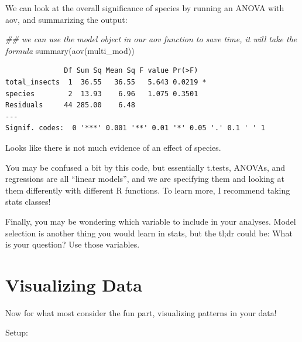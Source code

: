 \documentclass[
  letterpaper,
  DIV=11,
  numbers=noendperiod]{scrreprt}
\newenvironment{Shaded}{\begin{snugshade}}{\end{snugshade}}
\newcommand{\DocumentationTok}[1]{\textcolor[rgb]{0.37,0.37,0.37}{\textit{#1}}}
\newcommand{\FunctionTok}[1]{\textcolor[rgb]{0.28,0.35,0.67}{#1}}
\newcommand{\NormalTok}[1]{\textcolor[rgb]{0.00,0.23,0.31}{#1}}
\begin{document}
We can look at the overall significance of species by running an ANOVA
with aov, and summarizing the output:

\begin{Shaded}
\begin{Highlighting}[]
\DocumentationTok{\#\# we can use the model object in our aov function to save time, it will take the formula}
\FunctionTok{summary}\NormalTok{(}\FunctionTok{aov}\NormalTok{(multi\_mod))}
\end{Highlighting}
\end{Shaded}

\begin{verbatim}
              Df Sum Sq Mean Sq F value Pr(>F)  
total_insects  1  36.55   36.55   5.643 0.0219 *
species        2  13.93    6.96   1.075 0.3501  
Residuals     44 285.00    6.48                 
---
Signif. codes:  0 '***' 0.001 '**' 0.01 '*' 0.05 '.' 0.1 ' ' 1
\end{verbatim}

Looks like there is not much evidence of an effect of species.

You may be confused a bit by this code, but essentially t.tests, ANOVAs,
and regressions are all ``linear models'', and we are specifying them
and looking at them differently with different R functions. To learn
more, I recommend taking stats classes!

Finally, you may be wondering which variable to include in your
analyses. Model selection is another thing you would learn in stats, but
the tl;dr could be: What is your question? Use those variables.

\chapter{Visualizing Data}\label{visualizing-data}

Now for what most consider the fun part, visualizing patterns in your
data!

Setup:
\end{document}
